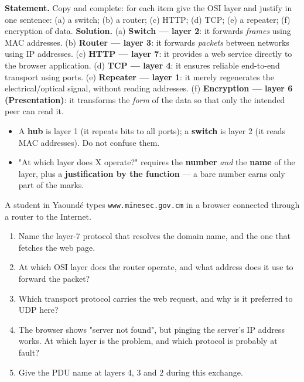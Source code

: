 \documentclass[11pt]{article}
\begin{document}
\begin{exoresolu}
\textbf{Statement.} Copy and complete: for each item give the OSI layer and justify in one sentence: (a) a switch; (b) a router; (c) HTTP; (d) TCP; (e) a repeater; (f) encryption of data. \tcblower
\textbf{Solution.} (a) \textbf{Switch — layer 2}: it forwards \emph{frames} using MAC addresses. (b) \textbf{Router — layer 3}: it forwards \emph{packets} between networks using IP addresses. (c) \textbf{HTTP — layer 7}: it provides a web service directly to the browser application. (d) \textbf{TCP — layer 4}: it ensures reliable end-to-end transport using ports. (e) \textbf{Repeater — layer 1}: it merely regenerates the electrical/optical signal, without reading addresses. (f) \textbf{Encryption — layer 6 (Presentation)}: it transforms the \emph{form} of the data so that only the intended peer can read it.
\end{exoresolu}

\begin{attention}
\begin{itemize}
\item A \textbf{hub} is layer 1 (it repeats bits to all ports); a \textbf{switch} is layer 2 (it reads MAC addresses). Do not confuse them.
\item "At which layer does X operate?" requires the \textbf{number} \emph{and} the \textbf{name} of the layer, plus a \textbf{justification by the function} — a bare number earns only part of the marks.
\end{itemize}
\end{attention}

\begin{exercice}
A student in Yaoundé types \texttt{www.minesec.gov.cm} in a browser connected through a router to the Internet.
\begin{enumerate}
\item Name the layer-7 protocol that resolves the domain name, and the one that fetches the web page.
\item At which OSI layer does the router operate, and what address does it use to forward the packet?
\item Which transport protocol carries the web request, and why is it preferred to UDP here?
\item The browser shows "server not found", but pinging the server's IP address works. At which layer is the problem, and which protocol is probably at fault?
\item Give the PDU name at layers 4, 3 and 2 during this exchange.
\end{enumerate}
\end{exercice}
\end{document}
